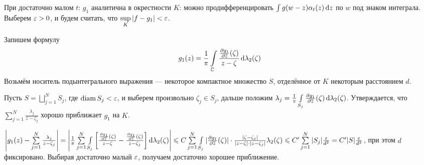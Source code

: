 \documentclass[a4paper]{report}
\begin{document}
{{    При достаточно малом $t$: $g_1$ аналитична в окрестности $K$: можно продифференцировать $\int g(w - z)\alpha_t(z)\operatorname{d}\! z$ по $w$ под знаком интеграла.
    Выберем $\varepsilon > 0$, и будем считать, что $\sup\limits_{K}|f - g_1| < \varepsilon$.

    Запишем формулу \[g_1(z) = \frac{1}{\pi}\int\limits_{\mathbb{C}}\frac{\frac{\partial g_1}{\partial \overline{z}}(\zeta)}{z - \zeta}\operatorname{d}\!\lambda_2(\zeta)\]
    Возьмём носитель подынтегрального выражения --- некоторое компактное множество $S$, отделённое от $K$ некоторым расстоянием $d$.

    Пусть $S = \bigsqcup\limits_{j = 1}^{N}S_j$, где $\operatorname{diam} S_j < \varepsilon$, и выберем произвольно $\zeta_j \in S_j$, дальше положим $\lambda_j = \frac{1}{\pi}\int\limits_{S_j}\frac{\partial g_1}{\partial \overline{z}}(\zeta)\operatorname{d}\!\lambda_2(\zeta)$.
    Утверждается, что $\sum\limits_{j = 1}^{N}\frac{\lambda_j}{z - \zeta_j}$ хорошо приближает $g_1$ на $K$.

    $\left|g_1(z) - \sum\limits_{j = 1}^{N}\frac{\lambda_j}{z - \zeta_j}\right| = \left|\frac{1}{\pi}\sum\limits_{j = 1}^{N}\int\limits_{S_j}\left[\frac{\frac{\partial g_1}{\partial \overline{z}}(\zeta)}{z - \zeta} - \frac{\frac{\partial g_1}{\partial \overline{z}}(\zeta)}{z - \zeta_j}\right]\operatorname{d}\!\lambda_2(\zeta)\right| \leqslant C \sum\limits_{j = 1}^{N}\int\limits_{S_j}|\frac{\partial g_1}{\partial \overline{z}}(\zeta)| \cdot \frac{|\zeta - \zeta_j|}{|z - \zeta|\cdot|z - \zeta_j|}\lambda_2(\zeta) \leqslant C'\sum\limits_{j = 1}^{N}|S_j|\frac{\varepsilon}{d^2} = C' |S| \frac{\varepsilon}{d^2}$, при этом $d$ фиксировано. Выбирая достаточно малый $\varepsilon$, получаем достаточно хорошее приближение.
    }
    }
\end{document}
